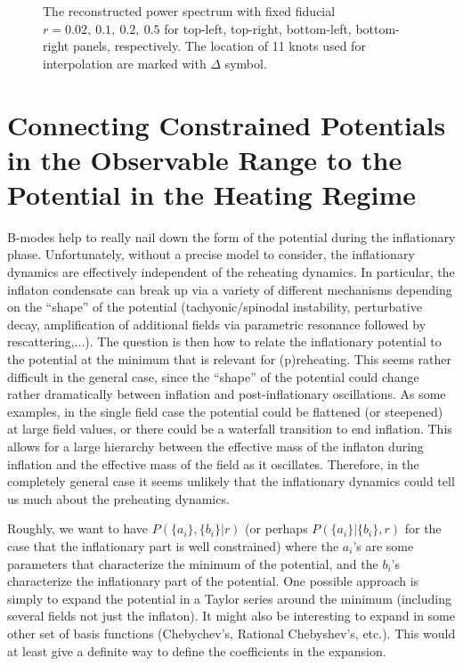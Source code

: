 \documentclass[11pt]{article}
\begin{document}
\begin{figure}
  \caption{The reconstructed power spectrum with fixed fiducial $r = 0.02,\ 0.1,\ 0.2,\ 0.5$ for top-left, top-right, bottom-left, bottom-right panels, respectively. The location of 11 knots used for interpolation are marked with $\Delta$ symbol. \label{fig:traj_potential_fixr}}
\end{figure}


\section{Connecting Constrained Potentials in the Observable Range to the Potential in the Heating Regime }

B-modes help to really nail down the form of the potential during the
inflationary phase.  
Unfortunately, without a precise model to consider, the inflationary
dynamics are effectively independent of the reheating dynamics.
In particular, the inflaton condensate can break up via a variety of
different mechanisms depending on the ``shape'' of the potential
(tachyonic/spinodal instability, perturbative decay, amplification of
additional fields via parametric resonance followed by rescattering,...). 
The question is then how to relate the inflationary potential to the
potential at the minimum that is relevant for (p)reheating.
This seems rather difficult in the general case, since the ``shape'' of the
potential could change rather dramatically between inflation and
post-inflationary oscillations.  As some examples, in the single field case
the potential could be flattened (or steepened) at large field values, or
there could be a waterfall transition to end inflation.  This allows for a
large hierarchy between the effective mass of the inflaton during inflation
and the effective mass of the field as it oscillates.  Therefore, in the
completely general case it seems unlikely that the inflationary dynamics
could tell us much about the preheating dynamics.

Roughly, we want to have $P(\{a_i\},\{b_i\}|r)$ (or perhaps
$P(\{a_i\}|\{b_i\},r)$ for the case that the inflationary part is well
constrained)
where the $a_i$'s are some parameters that characterize the minimum of the
potential, and the $b_i$'s characterize the inflationary part of the
potential.
One possible approach is simply to expand the potential in a Taylor series
around the minimum (including several fields not just the inflaton).
It might also be interesting to expand in some other set of basis functions
(Chebychev's, Rational Chebyshev's, etc.).
This would at least give a definite way to define the coefficients in the
expansion.
\end{document}
